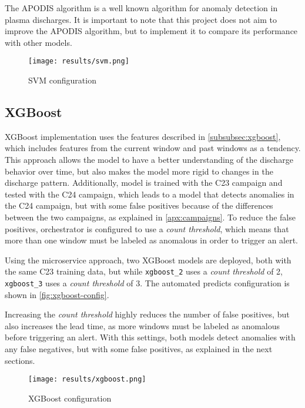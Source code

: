 The \ac{APODIS} algorithm is a well known algorithm for anomaly detection in plasma discharges. It is important to note that this project does not aim to improve the \ac{APODIS} algorithm, but to implement it to compare its performance with other models.

\begin{figure}[H]
    \centering
    \texttt{[image: results/svm.png]}
    \caption{SVM configuration}
    \label{fig:svm-config}
\end{figure}

\subsection{XGBoost}

XGBoost implementation uses the features described in \autoref{subsubsec:xgboost}, which includes features from the current window and past windows as a tendency. This approach allows the model to have a better understanding of the discharge behavior over time, but also makes the model more rigid to changes in the discharge pattern. Additionally, model is trained with the C23 campaign and tested with the C24 campaign, which leads to a model that detects anomalies in the C24 campaign, but with some false positives because of the differences between the two campaigns, as explained in \autoref{apx:campaigns}. To reduce the false positives, orchestrator is configured to use a \textit{count threshold}, which means that more than one window must be labeled as anomalous in order to trigger an alert. 

Using the microservice approach, two XGBoost models are deployed, both with the same C23 training data, but while \texttt{xgboost\_2} uses a \textit{count threshold} of 2, \texttt{xgboost\_3} uses a \textit{count threshold} of 3. The automated predicts configuration is shown in \autoref{fig:xgboost-config}.

Increasing the \textit{count threshold} highly reduces the number of false positives, but also increases the lead time, as more windows must be labeled as anomalous before triggering an alert. With this settings, both models detect anomalies with any false negatives, but with some false positives, as explained in the next sections.

\begin{figure}[H]
    \centering
    \texttt{[image: results/xgboost.png]}
    \caption{XGBoost configuration}
    \label{fig:xgboost-config}
\end{figure}

